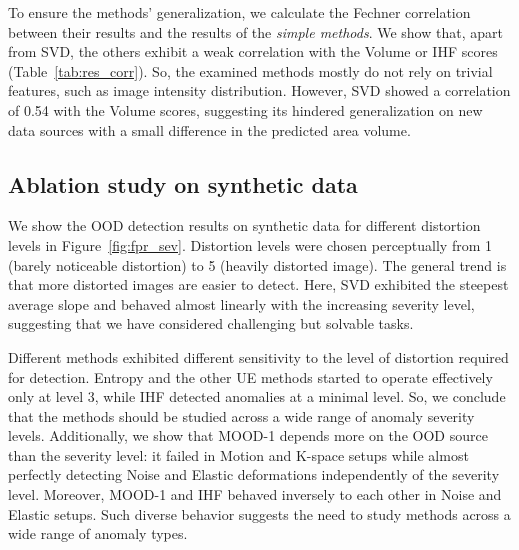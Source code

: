 To ensure the methods' generalization, we calculate the Fechner correlation between their results and the results of the \textit{simple methods}. We show that, apart from SVD, the others exhibit a weak correlation with the Volume or IHF scores (Table~\ref{tab:res_corr}). So, the examined methods mostly do not rely on trivial features, such as image intensity distribution. However, SVD showed a correlation of 0.54 with the Volume scores, suggesting its hindered generalization on new data sources with a small difference in the predicted area volume.




\subsection{Ablation study on synthetic data}

We show the OOD detection results on synthetic data for different distortion levels in Figure~\ref{fig:fpr_sev}. Distortion levels were chosen perceptually from 1 (barely noticeable distortion) to 5 (heavily distorted image). The general trend is that more distorted images are easier to detect. Here, SVD exhibited the steepest average slope and behaved almost linearly with the increasing severity level, suggesting that we have considered challenging but solvable tasks.

Different methods exhibited different sensitivity to the level of distortion required for detection. Entropy and the other UE methods started to operate effectively only at level 3, while IHF detected anomalies at a minimal level. So, we conclude that the methods should be studied across a wide range of anomaly severity levels. Additionally, we show that MOOD-1 depends more on the OOD source than the severity level: it failed in Motion and K-space setups while almost perfectly detecting Noise and Elastic deformations independently of the severity level. Moreover, MOOD-1 and IHF behaved inversely to each other in Noise and Elastic setups. Such diverse behavior suggests the need to study methods across a wide range of anomaly types.

